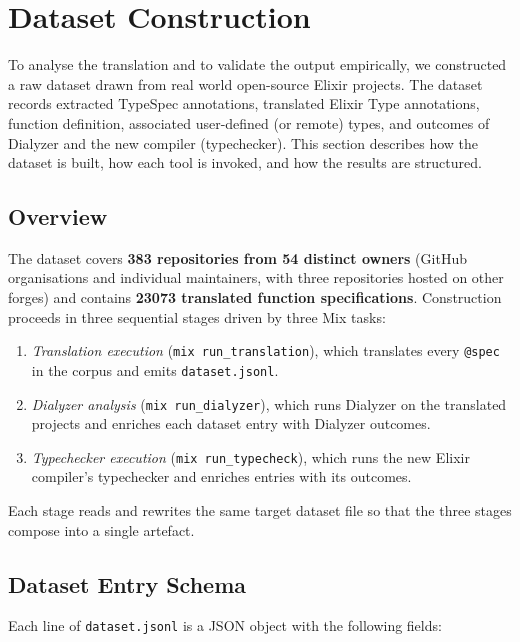 \section{Dataset Construction}
\label{sec:dataset-construction}

To analyse the translation and to validate the output empirically, we constructed a raw dataset drawn from real world open-source Elixir projects.
The dataset records extracted TypeSpec annotations, translated Elixir Type annotations, function definition, associated user-defined (or remote) types, and outcomes of Dialyzer and the new compiler (typechecker).
This section describes how the dataset is built, how each tool is invoked, and how the results are structured.

\subsection{Overview}
The dataset covers \textbf{383 repositories from 54 distinct owners} (GitHub organisations and individual maintainers, with three repositories hosted on other forges) and contains \textbf{\num{23073} translated function specifications}.
Construction proceeds in three sequential stages driven by three Mix tasks:
\begin{enumerate}
    \item \textit{Translation execution} (\texttt{mix run\_translation}), which translates every \texttt{@spec} in the corpus and emits \texttt{dataset.jsonl}.
    \item \textit{Dialyzer analysis} (\texttt{mix run\_dialyzer}), which runs Dialyzer on the translated projects and enriches each dataset entry with Dialyzer outcomes.
    \item \textit{Typechecker execution} (\texttt{mix run\_typecheck}), which runs the new Elixir compiler's typechecker and enriches entries with its outcomes.
\end{enumerate}
Each stage reads and rewrites the same target dataset file so that the three stages compose into a single artefact.

\subsection{Dataset Entry Schema}

Each line of \texttt{dataset.jsonl} is a JSON object with the following fields:

